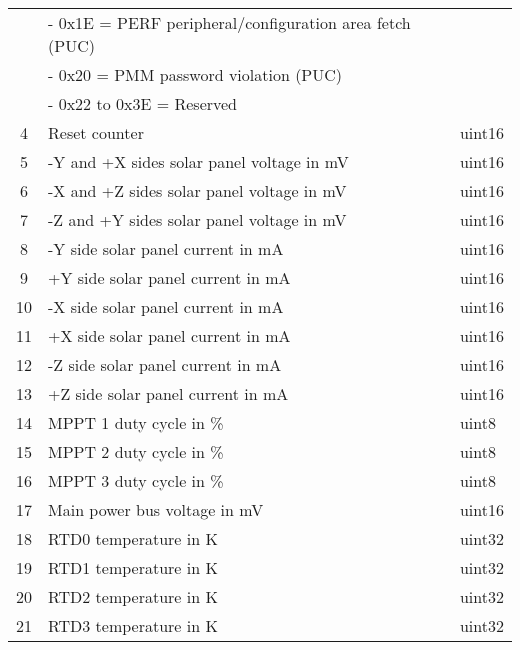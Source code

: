 \begin{longtable}[c]{cL{0.82\textwidth}l}
        & - 0x1E = PERF peripheral/configuration area fetch (PUC)           &        \\
        & - 0x20 = PMM password violation (PUC)                             &        \\
        & - 0x22 to 0x3E = Reserved                                         &        \\
    4   & Reset counter                                                     & uint16 \\
    5   & -Y and +X sides solar panel voltage in mV                         & uint16 \\
    6   & -X and +Z sides solar panel voltage in mV                         & uint16 \\
    7   & -Z and +Y sides solar panel voltage in mV                         & uint16 \\
    8   & -Y side solar panel current in mA                                 & uint16 \\
    9   & +Y side solar panel current in mA                                 & uint16 \\
    10  & -X side solar panel current in mA                                 & uint16 \\
    11  & +X side solar panel current in mA                                 & uint16 \\
    12  & -Z side solar panel current in mA                                 & uint16 \\
    13  & +Z side solar panel current in mA                                 & uint16 \\
    14  & MPPT 1 duty cycle in \%                                           & uint8 \\
    15  & MPPT 2 duty cycle in \%                                           & uint8 \\
    16  & MPPT 3 duty cycle in \%                                           & uint8 \\
    17  & Main power bus voltage in mV                                      & uint16 \\
    18  & RTD0 temperature in K                                             & uint32 \\
    19  & RTD1 temperature in K                                             & uint32 \\
    20  & RTD2 temperature in K                                             & uint32 \\
    21  & RTD3 temperature in K                                             & uint32 \\

\end{longtable}
